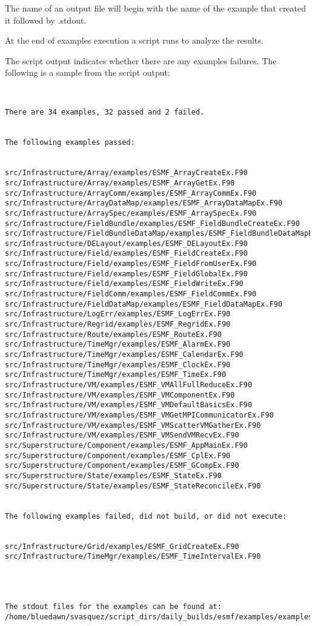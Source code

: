The name of an output file will begin with the name of the example
that created it followed by .stdout.

At the end of examples execution a script runs to analyze the results.

The script output indicates whether there are any examples failures.
The following is a sample from the script output:

\begin{verbatim}


There are 34 examples, 32 passed and 2 failed.


The following examples passed:


src/Infrastructure/Array/examples/ESMF_ArrayCreateEx.F90
src/Infrastructure/Array/examples/ESMF_ArrayGetEx.F90
src/Infrastructure/ArrayComm/examples/ESMF_ArrayCommEx.F90
src/Infrastructure/ArrayDataMap/examples/ESMF_ArrayDataMapEx.F90
src/Infrastructure/ArraySpec/examples/ESMF_ArraySpecEx.F90
src/Infrastructure/FieldBundle/examples/ESMF_FieldBundleCreateEx.F90
src/Infrastructure/FieldBundleDataMap/examples/ESMF_FieldBundleDataMapEx.F90
src/Infrastructure/DELayout/examples/ESMF_DELayoutEx.F90
src/Infrastructure/Field/examples/ESMF_FieldCreateEx.F90
src/Infrastructure/Field/examples/ESMF_FieldFromUserEx.F90
src/Infrastructure/Field/examples/ESMF_FieldGlobalEx.F90
src/Infrastructure/Field/examples/ESMF_FieldWriteEx.F90
src/Infrastructure/FieldComm/examples/ESMF_FieldCommEx.F90
src/Infrastructure/FieldDataMap/examples/ESMF_FieldDataMapEx.F90
src/Infrastructure/LogErr/examples/ESMF_LogErrEx.F90
src/Infrastructure/Regrid/examples/ESMF_RegridEx.F90
src/Infrastructure/Route/examples/ESMF_RouteEx.F90
src/Infrastructure/TimeMgr/examples/ESMF_AlarmEx.F90
src/Infrastructure/TimeMgr/examples/ESMF_CalendarEx.F90
src/Infrastructure/TimeMgr/examples/ESMF_ClockEx.F90
src/Infrastructure/TimeMgr/examples/ESMF_TimeEx.F90
src/Infrastructure/VM/examples/ESMF_VMAllFullReduceEx.F90
src/Infrastructure/VM/examples/ESMF_VMComponentEx.F90
src/Infrastructure/VM/examples/ESMF_VMDefaultBasicsEx.F90
src/Infrastructure/VM/examples/ESMF_VMGetMPICommunicatorEx.F90
src/Infrastructure/VM/examples/ESMF_VMScatterVMGatherEx.F90
src/Infrastructure/VM/examples/ESMF_VMSendVMRecvEx.F90
src/Superstructure/Component/examples/ESMF_AppMainEx.F90
src/Superstructure/Component/examples/ESMF_CplEx.F90
src/Superstructure/Component/examples/ESMF_GCompEx.F90
src/Superstructure/State/examples/ESMF_StateEx.F90
src/Superstructure/State/examples/ESMF_StateReconcileEx.F90


The following examples failed, did not build, or did not execute:


src/Infrastructure/Grid/examples/ESMF_GridCreateEx.F90
src/Infrastructure/TimeMgr/examples/ESMF_TimeIntervalEx.F90




The stdout files for the examples can be found at:
/home/bluedawn/svasquez/script_dirs/daily_builds/esmf/examples/examplesO/AIX.default.64.default

\end{verbatim}
